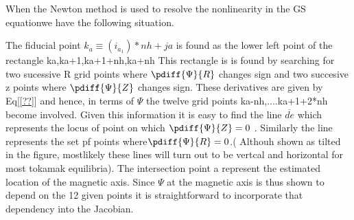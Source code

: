 When the Newton method is used to resolve the nonlinearity in the GS
equationwe have the following situation.




The fiducial point $k_a \equiv (i_a_1)*nh +ja $ is found as the lower
left point of the rectangle { ka,ka+1,ka+1+nh,ka+nh} This rectangle is
is found by searching for two sucessive R grid points where
$\pdiff{\Psi}{R} $ changes sign and two succesive z points where
$\pdiff{\Psi}{Z} $ changes sign. These derivatives are given by
Eq[\ref{??}] and hence, in terms of $\Psi$ the twelve grid points
{ka-nh,....ka+1+2*nh} become involved. Given this information  it is easy to find the line
$\overbar{de}$  which represents the locus of point on which
$\pdiff{\Psi}{Z} =0 $ . Similarly the line  represents
the set pf points where$\pdiff{\Psi}{R} =0 $.( Althouh shown as tilted
in the figure, mostlikely these lines will turn out to be vertcal and
horizontal for most tokamak equilibria). The intersection point a
represent the estimated location of the magnetic axis. Since $\Psi $
at the magnetic axis is thus shown to depend on the 12 given points it
is straightforward to incorporate that dependency into the Jacobian.
